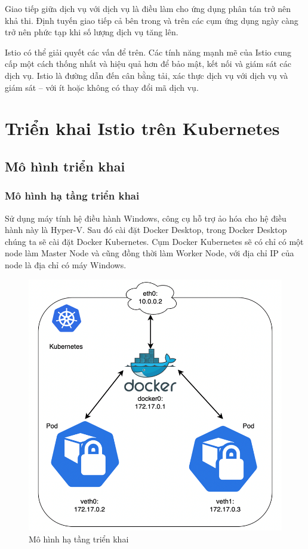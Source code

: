 \documentclass[12pt,a4paper]{report}
\begin{document}
{{		Giao tiếp giữa dịch vụ với dịch vụ là điều làm cho ứng dụng phân tán trở nên khả thi. Định tuyến giao tiếp cả bên trong và trên các cụm ứng dụng ngày càng trở nên phức tạp khi số lượng dịch vụ tăng lên.
		
		Istio có thể giải quyết các vấn để trên. Các tính năng mạnh mẽ của Istio cung cấp một cách thống nhất và hiệu quả hơn để bảo mật, kết nối và giám sát các dịch vụ. Istio là đường dẫn đến cân bằng tải, xác thực dịch vụ với dịch vụ và giám sát – với ít hoặc không có thay đổi mã dịch vụ.
		
\chapter{Triển khai Istio trên Kubernetes}
	\section{Mô hình triển khai}
	\subsection{Mô hình hạ tầng triển khai}
	Sử dụng máy tính hệ điều hành Windows, công cụ hỗ trợ ảo hóa cho hệ điều hành này là Hyper-V. Sau đó cài đặt Docker Desktop, trong Docker Desktop chúng ta sẽ cài đặt Docker Kubernetes. Cụm Docker Kubernetes sẽ có chỉ có một node làm Master Node và cũng đồng thời làm Worker Node, với địa chỉ IP của node là địa chỉ có máy Windows.
	
	\begin{figure}[h]
		\centering
		\includegraphics[width=0.7\linewidth]{Pics/3.1.1-1}
		\caption{Mô hình hạ tầng triển khai}
		\label{fig:3.1.1-1}
	\end{figure}
	\newpage
}}
\end{document}

